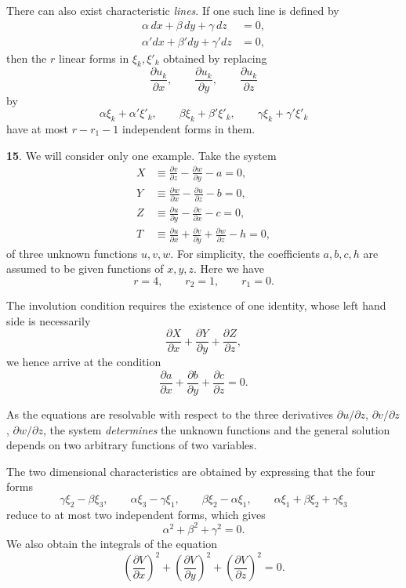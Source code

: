 \documentclass[leqno,11pt]{article}
\newcommand{\pd}{\partial}
\theoremstyle{shape1}
\theoremstyle{shape0}
\theoremstyle{shape2}
\theoremstyle{definition}
\begin{document}
There can also exist characteristic \emph{lines}. If one such line is defined by
\begin{align*}
  \alpha\,dx+\beta\,dy+\gamma\,dz&=0,\\
  \alpha'dx+\beta'dy+\gamma'dz&=0,
\end{align*}
then the $r$ linear forms in $\xi_{k},\xi'_{k}$ obtained by replacing
\[
\frac{\pd u_{k}}{\pd x},\qquad\frac{\pd u_{k}}{\pd y},\qquad\frac{\pd u_{k}}{\pd z}
\]
by
\[
\alpha\xi_{k}+\alpha'\xi'_{k},\qquad\beta\xi_{k}+\beta'\xi'_{k},\qquad\gamma\xi_{k}+\gamma'\xi'_{k}
\]
have at most $r-r_{1}-1$ independent forms in them.

\vspace{12pt}

\textbf{15}. We will consider only one example. Take the system
\begin{align*}
  X&\equiv\frac{\pd v}{\pd z}-\frac{\pd w}{\pd y}-a=0,\\
  Y&\equiv\frac{\pd w}{\pd x}-\frac{\pd u}{\pd z}-b=0,\\
  Z&\equiv\frac{\pd u}{\pd y}-\frac{\pd v}{\pd x}-c=0,\\
  T&\equiv\frac{\pd u}{\pd x}+\frac{\pd v}{\pd y}+\frac{\pd w}{\pd z}-h=0,
\end{align*}
of three unknown functions $u,v,w$. For simplicity, the coefficients $a,b,c,h$ are assumed to be given functions of $x,y,z$. Here we have
\[
r=4,\qquad r_{2}=1,\qquad r_{1}=0.
\]

The involution condition requires the existence of one identity, whose left hand side is necessarily
\[
\frac{\pd X}{\pd x}+\frac{\pd Y}{\pd y}+\frac{\pd Z}{\pd z},
\]
we hence arrive at the condition
\[
\frac{\pd a}{\pd x}+\frac{\pd b}{\pd y}+\frac{\pd c}{\pd z}=0.
\]

As the equations are resolvable with respect to the three derivatives $\pd u/\pd z$, $\pd v/\pd z$, $\pd w/\pd z$, the system \emph{determines} the unknown functions and the general solution depends on two arbitrary functions of two variables.

The two dimensional characteristics are obtained by expressing that the four forms
\[
\gamma\xi_{2}-\beta\xi_{3},\qquad\alpha\xi_{3}-\gamma\xi_{1},\qquad\beta\xi_{2}-\alpha\xi_{1},\qquad\alpha\xi_{1}+\beta\xi_{2}+\gamma\xi_{3}
\]
reduce to at most two independent forms, which gives
\[
\alpha^{2}+\beta^{2}+\gamma^{2}=0.
\]
We also obtain the integrals of the equation
\[
\left(\frac{\pd V}{\pd x}\right)^{2}+\left(\frac{\pd V}{\pd y}\right)^{2}+\left(\frac{\pd V}{\pd z}\right)^{2}=0.
\]
\end{document}
